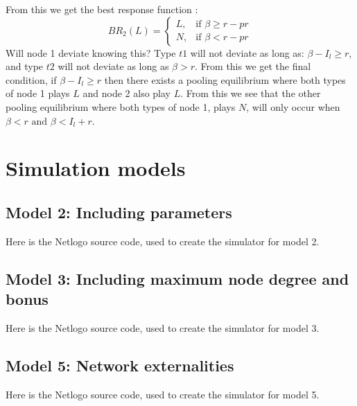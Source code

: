 From this we get the best response function :
\begin{equation}
BR_{2}(L)=
\begin{cases}
	L,& \text{if } \beta\geq r-pr\\
   N,& \text{if } \beta<r-pr  
\end{cases}
\end{equation}
Will node 1 deviate knowing this?
Type $t1$ will not deviate as long as: $\beta - I_{l} \geq r$, and type $t2$ will not deviate as long as $\beta >r$.
From this we get the final condition, if $\beta-I_{l}\geq r$ then there exists a pooling equilibrium where both types of node 1 plays $L$ and node 2 also play $L$.
From this we see that the other pooling equilibrium where both types of node 1, plays $N$, will only occur when $\beta<r \text{ and } \beta<I_l+r$.

\chapter{Simulation models}
\section{Model 2: Including parameters}
Here is the Netlogo source code, used to create the simulator for model 2.

\section{Model 3: Including maximum node degree and bonus}
Here is the Netlogo source code, used to create the simulator for model 3.

\section{Model 5: Network externalities}
Here is the Netlogo source code, used to create the simulator for model 5.

